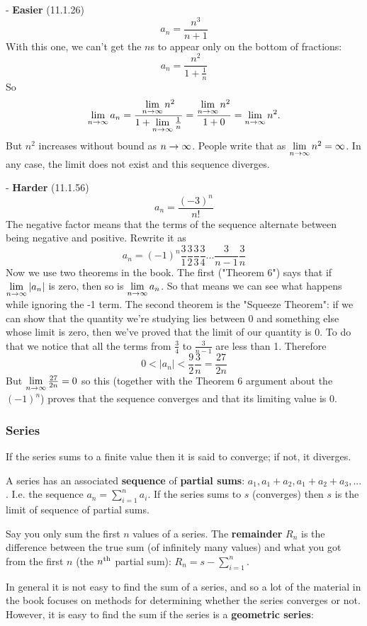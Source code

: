- \textbf{Easier} (11.1.26)
  $$
  a_n = \frac{n^3}{n + 1}
  $$
  With this one, we can't get the $n$s to appear only on the bottom of fractions:
  $$
  a_n = \frac{n^2}{1 + \frac{1}{n}}
  $$
  So
  $$
  \lim\limits_{n \to \infty} a_n = \frac{\lim\limits_{n \to \infty} n^2}{1 + \lim\limits_{n \to \infty}\frac{1}{n}} = \frac{\lim\limits_{n \to \infty} n^2}{1 + 0} = \lim\limits_{n \to \infty} n^2.
  $$
  But $n^2$ increases without bound as $n \rightarrow \infty$. People write that as $\lim\limits_{n \to \infty} n^2 = \infty$. In any case, the limit does not exist and this sequence diverges.

- \textbf{Harder} (11.1.56)
  $$
  a_n = \frac{(-3)^n}{n!}
  $$
  The negative factor means that the terms of the sequence alternate between being negative and positive. Rewrite it as
  $$
  a_n = (-1)^n\frac{3}{1}\frac{3}{2}\frac{3}{3}\frac{3}{4}...\frac{3}{n-1}\frac{3}{n}
  $$
  Now we use two theorems in the book. The first ("Theorem 6") says that if $\lim\limits_{n \to \infty} |a_n|$ is zero, then so is $\lim\limits_{n \to \infty} a_n$. So that means we can see what happens while ignoring the -1 term. The second theorem is the "Squeeze Theorem": if we can show that the quantity we're studying lies between 0 and something else whose limit is zero, then we've proved that the limit of our quantity is 0. To do that we notice that all the terms from $\frac{3}{4}$ to $\frac{3}{n-1}$ are less than 1. Therefore
  $$
  0 < |a_n| < \frac{9}{2}\frac{3}{n} = \frac{27}{2n}
  $$
  But $\lim\limits_{n \to \infty} \frac{27}{2n} = 0$ so this (together with the Theorem 6 argument about the $(-1)^n$) proves that the sequence converges and that its limiting value is 0.

\subsubsection{Series}

If the series sums to a finite value then it is said to converge; if not, it diverges.

A series has an associated \textbf{sequence} of \textbf{partial sums}: $a_1, a_1 + a_2, a_1 + a_2 + a_3, ...$. I.e. the sequence $a_n = \sum_{i=1}^n a_i$. If the series sums to $s$ (converges) then $s$ is the limit of sequence of partial sums.

Say you only sum the first $n$ values of a series. The \textbf{remainder} $R_n$ is the difference between the true sum (of infinitely many values) and what you got from the first $n$ (the $n^{\text{th}}$ partial sum): $R_n = s - \sum_{i=1}^n$.



In general it is not easy to find the sum of a series, and so a lot of the material in the book focuses on methods for determining whether the series converges or not. However, it is easy to find the sum if the series is a \textbf{geometric series}:


